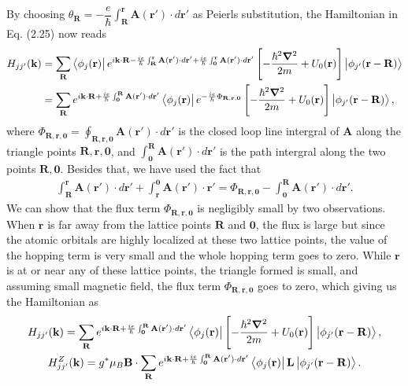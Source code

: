 \documentclass{report}
\newcommand{\f}[2]{\dfrac{#1}{#2}}
\begin{document}
By choosing $\theta_{\mathbf{R}} = - \f{e}{\hbar} \int_{\mathbf{R}}^{\mathbf{r}} \mathbf{A(\mathbf{r'})} \cdot d\mathbf{r'}$ as Peierls substitution, the Hamiltonian in Eq. (2.25) now reads
\begin{equation}
	\begin{aligned}
		H_{jj'}(\mathbf{k})
		 & = \sum_{\mathbf{R}} \bra{\phi_{j}(\mathbf{r})} e^{i\mathbf{k \cdot R} - \frac{ie}{\hbar} \int_{\mathbf{R}}^{\mathbf{r}} \mathbf{A}(\mathbf{r'}) \cdot d\mathbf{r'} + \frac{ie}{\hbar}\int_{\mathbf{0}}^{\mathbf{r}}\mathbf{A(\mathbf{r'})}\cdot d\mathbf{r'} } \left[- \f{\hbar^{2} \boldsymbol{\nabla}^{2}}{2m} + U_{0} (\mathbf{r}) \right] \ket{\phi_{j'}(\mathbf{r - R})} \nonumber \\
		 & = \sum_{\mathbf{R}}  e^{i\mathbf{k \cdot R} + \frac{ie}{\hbar} \int_{\mathbf{0}}^{\mathbf{R}} \mathbf{A(\mathbf{r'})} \cdot d \mathbf{r'} } \bra{\phi_{j}(\mathbf{r})} e^{-\frac{ie}{\hbar} \Phi_{\mathbf{R,r,0}}} \left[ -\f{\hbar^{2} \boldsymbol{\nabla}^{2}}{2m} + U_{0} (\mathbf{r}) \right] \ket{\phi_{j'}(\mathbf{r - R})},
	\end{aligned}
\end{equation}
where $\Phi_{\mathbf{R,r,0}} = \oint_{\mathbf{R,r,0}} \mathbf{A(\mathbf{r'})} \cdot d\mathbf{r'} $ is the closed loop line intergral of $\mathbf{A}$ along the triangle points $\mathbf{R,r,0}$, and $\int_{\mathbf{0}}^{\mathbf{R}} \mathbf{A(\mathbf{r'})} \cdot d \mathbf{r'}$ is the path intergral along the two points $\mathbf{R,0}$. Besides that, we have used the fact that
\begin{align}
	\int_{\mathbf{R}}^{\mathbf{r}} \mathbf{A(\mathbf{r'})} \cdot d\mathbf{r'} + \int_{\mathbf{r}}^{\mathbf{0}} \mathbf{A(r')} \cdot \mathbf{r'} = \Phi_{\mathbf{R,r,0}} - \int_{\mathbf{0}}^{\mathbf{R}} \mathbf{A(\mathbf{r'})} \cdot d \mathbf{r'}.
\end{align}
We can show that the flux term $\Phi_{\mathbf{R,r,0}}$ is negligibly small \cite{yalcin_2019} by two observations. When $\mathbf{r}$ is far away from the lattice points $\mathbf{R}$ and $\mathbf{0}$, the flux is large but since the atomic orbitals are highly localized at these two lattice points, the value of the hopping term is very small and the whole hopping term goes to zero. While $\mathbf{r}$ is at or near any of these lattice points, the triangle formed is small, and assuming small magnetic field, the flux term $\Phi_{\mathbf{R,r,0}}$ goes to zero, which giving us the Hamiltonian as
\begin{gather}
	H_{jj'}(\mathbf{k})
	= \sum_{\mathbf{R}} e^{i\mathbf{k \cdot R} + \frac{ie}{\hbar} \int_{\mathbf{0}}^{\mathbf{R}} \mathbf{A(\mathbf{r'})} \cdot d \mathbf{r'} } \bra{\phi_{j}(\mathbf{r})} \left[ -\f{\hbar^{2} \boldsymbol{\nabla}^{2}}{2m} + U_{0} (\mathbf{r}) \right] \ket{\phi_{j'}(\mathbf{r - R})},\\
	H_{jj'}^{Z}(\mathbf{k})
	= g^{*} \mu_{B} \mathbf{B} \cdot \sum_{\mathbf{R}} e^{i\mathbf{k \cdot R} + \frac{ie}{\hbar} \int_{\mathbf{0}}^{\mathbf{R}} \mathbf{A(\mathbf{r'})} \cdot d\mathbf{r'} } \bra{\phi_{j}(\mathbf{r})} \mathbf{L} \ket{\phi_{j'}(\mathbf{r - R})}.
\end{gather}
\end{document}
